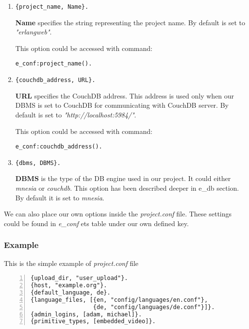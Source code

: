 \begin{enumerate}
\item
\begin{verbatim}
{project_name, Name}.
\end{verbatim}
{\bf Name} specifies the string representing the project name. By default is set to {\it "erlangweb"}.

This option could be accessed with command:
\begin{verbatim}
e_conf:project_name().
\end{verbatim}

\item
\begin{verbatim}
{couchdb_address, URL}.
\end{verbatim}
{\bf URL} specifies the CouchDB address. This address is used only when our DBMS is set to CouchDB for communicating with CouchDB server. By default is set to {\it "http://localhost:5984/"}.

This option could be accessed with command:
\begin{verbatim}
e_conf:couchdb_address().
\end{verbatim}

\item
\begin{verbatim}
{dbms, DBMS}.
\end{verbatim}
{\bf DBMS} is the type of the DB engine used in our project. It could either {\it mnesia} or {\it couchdb}. This option has been described deeper in e\_db section. By default it is set to {\it mnesia}.

\end{enumerate}

We can also place our own options inside the {\it project.conf} file. These settings could be found in {\it e\_conf} ets table under our own defined key. 

\subsubsection{Example} This is the simple example of {\it project.conf} file
\begin{Verbatim}[numbers=left]
{upload_dir, "user_upload"}.
{host, "example.org"}.
{default_language, de}.
{language_files, [{en, "config/languages/en.conf"}, 
                  {de, "config/languages/de.conf"}]}.
{admin_logins, [adam, michael]}.
{primitive_types, [embedded_video]}.
\end{Verbatim}


